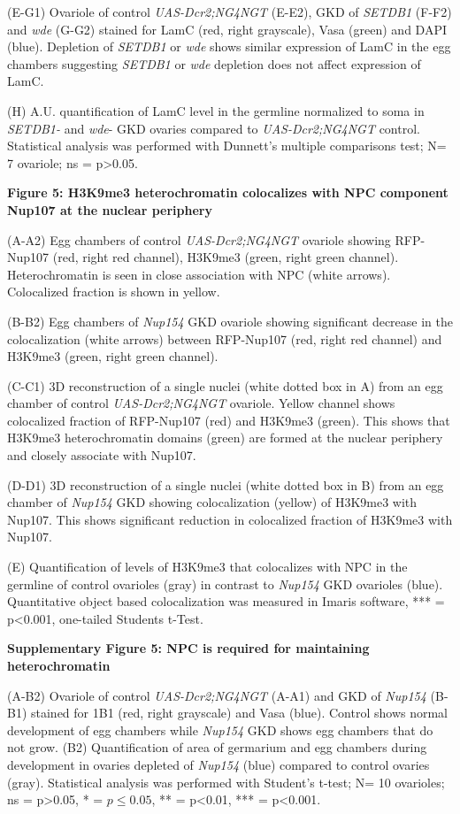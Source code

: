 \documentclass[12pt,oneside]{reedthesis}
\begin{document}
(E-G1) Ovariole of control \emph{UAS-Dcr2;NG4NGT} (E-E2), GKD of \emph{SETDB1}
(F-F2) and \emph{wde} (G-G2) stained for LamC (red, right grayscale), Vasa
(green) and DAPI (blue). Depletion of \emph{SETDB1} or \emph{wde} shows similar
expression of LamC in the egg chambers suggesting \emph{SETDB1} or \emph{wde}
depletion does not affect expression of LamC.

(H) A.U. quantification of LamC level in the germline normalized to soma
in \emph{SETDB1-} and \emph{wde}- GKD ovaries compared to \emph{UAS-Dcr2;NG4NGT}
control. Statistical analysis was performed with Dunnett's multiple
comparisons test; N= 7 ovariole; ns = p\textgreater0.05.

\textbf{Figure 5: H3K9me3 heterochromatin colocalizes with NPC component
Nup107 at the nuclear periphery}

(A-A2) Egg chambers of control \emph{UAS-Dcr2;NG4NGT} ovariole showing
RFP-Nup107 (red, right red channel), H3K9me3 (green, right green
channel). Heterochromatin is seen in close association with NPC (white
arrows). Colocalized fraction is shown in yellow.

(B-B2) Egg chambers of \emph{Nup154} GKD ovariole showing significant
decrease in the colocalization (white arrows) between RFP-Nup107 (red,
right red channel) and H3K9me3 (green, right green channel).

(C-C1) 3D reconstruction of a single nuclei (white dotted box in A) from
an egg chamber of control \emph{UAS-Dcr2;NG4NGT} ovariole. Yellow channel
shows colocalized fraction of RFP-Nup107 (red) and H3K9me3 (green). This
shows that H3K9me3 heterochromatin domains (green) are formed at the
nuclear periphery and closely associate with Nup107.

(D-D1) 3D reconstruction of a single nuclei (white dotted box in B) from
an egg chamber of \emph{Nup154} GKD showing colocalization (yellow) of
H3K9me3 with Nup107. This shows significant reduction in colocalized
fraction of H3K9me3 with Nup107.

(E) Quantification of levels of H3K9me3 that colocalizes with NPC in the
germline of control ovarioles (gray) in contrast to \emph{Nup154} GKD
ovarioles (blue). Quantitative object based colocalization was measured
in Imaris software, *** = p\textless0.001, one-tailed Students t-Test.

\textbf{Supplementary Figure 5: NPC is required for maintaining
heterochromatin}

(A-B2) Ovariole of control \emph{UAS-Dcr2;NG4NGT} (A-A1) and GKD of \emph{Nup154}
(B-B1) stained for 1B1 (red, right grayscale) and Vasa (blue). Control
shows normal development of egg chambers while \emph{Nup154} GKD shows egg
chambers that do not grow. (B2) Quantification of area of germarium and
egg chambers during development in ovaries depleted of \emph{Nup154} (blue)
compared to control ovaries (gray). Statistical analysis was performed
with Student's t-test; N= 10 ovarioles; ns = p\textgreater0.05, * = \(p \le 0.05\),
** = p\textless0.01, *** = p\textless0.001.
\end{document}
